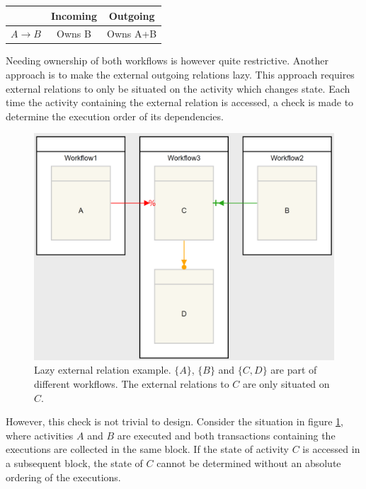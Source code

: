 \documentclass{article}
\begin{document}
			\begin{table}[!ht]
				\begin{tabular}{|c|c|c|}
				\hline
				 					& Incoming 	& Outgoing \\ \hline
				$A \rightarrow B$ 	& Owns B    & Owns A+B \\
				\hline
				\end{tabular}
			\end{table}
			
			Needing ownership of both workflows is however quite restrictive.
			Another approach is to make the external outgoing relations lazy.
			This approach requires external relations to only be situated on the activity which changes state.
			Each time the activity containing the external relation is accessed, a check is made to determine the execution order of its dependencies.

			\begin{figure}[!ht]
				\centering
				\includegraphics[scale=0.4]{figures/lazy-external-relation-example.PNG}
			 	\caption[Lazy external relation example]
			 	{Lazy external relation example. $\{A\}$, $\{B\}$ and $\{C, D\}$ are part of different workflows. The external relations to $C$ are only situated on $C$.}
			 	\label{fig:lazy-external-relations-example}
			\end{figure}

			However, this check is not trivial to design.
			Consider the situation in figure \ref{fig:lazy-external-relations-example}, where activities $A$ and $B$ are executed and both transactions containing the executions are collected in the same block. If the state of activity $C$ is accessed in a subsequent block, the state of $C$ cannot be determined without an absolute ordering of the executions.
\end{document}
